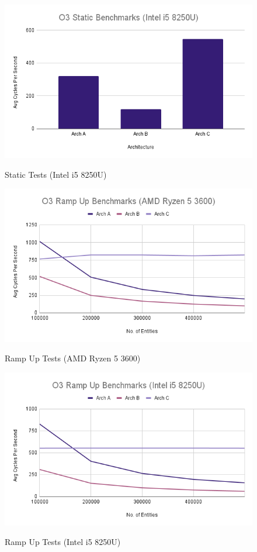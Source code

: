 \documentclass{article}
\begin{document}
\begin{figure}[!h]
\centering
\includegraphics[scale=0.5]{O3 Static Benchmarks (Intel i5 8250U).png}
\label{lapotp_static_tests}
\caption{Static Tests (Intel i5 8250U)}
\end{figure}

\begin{figure}[!h]
\centering
\includegraphics[scale=0.5]{O3 Ramp Up Benchmarks (AMD Ryzen 5 3600).png}
\label{pc_ramp_up_tests}
\caption{Ramp Up Tests (AMD Ryzen 5 3600)}
\end{figure}

\begin{figure}[!h]
\centering
\includegraphics[scale=0.5]{O3 Ramp Up Benchmarks (Intel i5 8250U).png}
\label{lapotp_ramp_up_tests}
\caption{Ramp Up Tests (Intel i5 8250U)}
\end{figure}
\end{document}
